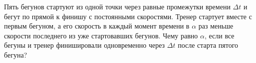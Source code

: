 Пять бегунов стартуют из одной точки через равные промежутки времени $\Delta t$ и бегут по прямой к финишу с постоянными скоростями. Тренер стартует вместе с первым бегуном, а его скорость в каждый момент времени в $\alpha$ раз меньше скорости последнего из уже стартовавших бегунов. Чему равно $\alpha$, если все бегуны и тренер финишировали одновременно через $\Delta t$ после старта пятого бегуна?
